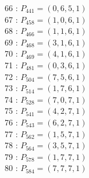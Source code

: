 \documentclass{article}
\begin{document}
{\begin{multicols}{3}
66 : $P_{441}=( 0, 6, 5, 1 )$\\
67 : $P_{458}=( 1, 0, 6, 1 )$\\
68 : $P_{466}=( 1, 1, 6, 1 )$\\
69 : $P_{468}=( 3, 1, 6, 1 )$\\
70 : $P_{469}=( 4, 1, 6, 1 )$\\
71 : $P_{481}=( 0, 3, 6, 1 )$\\
72 : $P_{504}=( 7, 5, 6, 1 )$\\
73 : $P_{514}=( 1, 7, 6, 1 )$\\
74 : $P_{528}=( 7, 0, 7, 1 )$\\
75 : $P_{541}=( 4, 2, 7, 1 )$\\
76 : $P_{543}=( 6, 2, 7, 1 )$\\
77 : $P_{562}=( 1, 5, 7, 1 )$\\
78 : $P_{564}=( 3, 5, 7, 1 )$\\
79 : $P_{578}=( 1, 7, 7, 1 )$\\
80 : $P_{584}=( 7, 7, 7, 1 )$\\
\end{multicols}


%


%


}%
\end{document}
